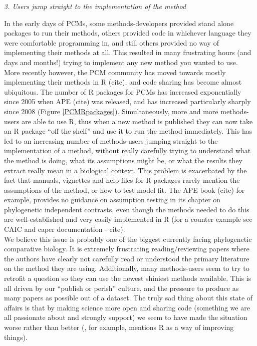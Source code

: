 \documentclass[a4paper,12pt]{article}
\renewcommand{\subsection}[1]{
  \bigskip
  \begin{center}
  \begin{large}
  \normalfont\itshape #1
  \end{large}
  \end{center}
}
\begin{document}
\subsection{3. Users jump straight to the implementation of the method}
In the early days of PCMs, some methods-developers provided stand alone packages to run their methods, others provided code in whichever language they were comfortable programming in, and still others provided no way of implementing their methods at all. 
This resulted in many frustrating hours (and days and months!) trying to implement any new method you wanted to use.\\

More recently however, the PCM community has moved towards mostly implementing their methods in R (cite), and code sharing has become almost ubiquitous. 
The number of R packages for PCMs has increased exponentially since 2005 when APE (cite) was released, and has increased particularly sharply since 2008 (Figure \ref{PCMRpackages}).
Simultaneously, more and more methods-users are able to use R, thus when a new method is published they can now take an R package ``off the shelf'' and use it to run the method immediately.
This has led to an increasing number of methods-users jumping straight to the implementation of a method, without really carefully trying to understand what the method is doing, what its assumptions might be, or what the results they extract really mean in a biological context.
This problem is exacerbated by the fact that manuals, vignettes and help files for R packages rarely mention the assumptions of the method, or how to test model fit. 
The APE book (cite) for example, provides no guidance on assumption testing in its chapter on phylogenetic independent contrasts, even though the methods needed to do this are well-established and very easily implemented in R (for a counter example see CAIC and caper documentation - cite).\\
We believe this issue is probably one of the biggest currently facing phylogenetic comparative biology. It is extremely frustrating reading/reviewing papers where the authors have clearly not carefully read or understood the primary literature on the method they are using. 
Additionally, many methods-users seem to try to retrofit a question so they can use the newest shiniest methods available. This is all driven by our ``publish or perish'' culture, and the pressure to produce as many papers as possible out of a dataset.
The truly sad thing about this state of affairs is that by making science more open and sharing code (something we are all passionate about and strongly support) we seem to have made the situation worse rather than better (\citealp{freckleton2009seven}, for example, mentions R as a way of improving things). %
\end{document}
